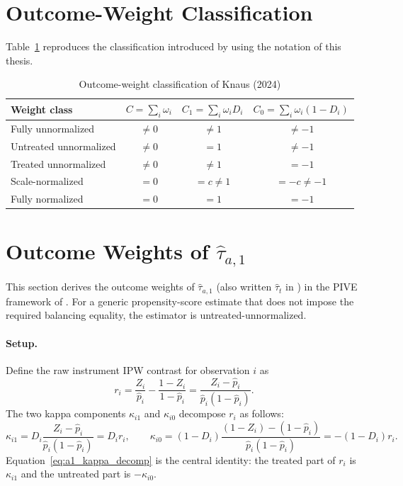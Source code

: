 \documentclass[12pt, a4paper, oneside]{article}
\theoremstyle{plain}
\theoremstyle{definition}
\begin{document}
\section{Outcome-Weight Classification}
Table~\ref{tab:knaus_weight_classes} reproduces the classification introduced
by \citet[Table~4]{knaus2024treatment} using the notation of this thesis.
\begin{table}[htbp]
\centering
\caption{Outcome-weight classification of Knaus (2024)}
\label{tab:knaus_weight_classes}
\begin{tabular}{lccc}
\toprule
Weight class
& \(C=\sum_i\omega_i\)
& \(C_1=\sum_i\omega_iD_i\)
& \(C_0=\sum_i\omega_i(1-D_i)\) \\
\midrule
Fully unnormalized
& \(\neq 0\)
& \(\neq 1\)
& \(\neq -1\) \\

Untreated unnormalized
& \(\neq 0\)
& \(=1\)
& \(\neq -1\) \\

Treated unnormalized
& \(\neq 0\)
& \(\neq 1\)
& \(=-1\) \\

Scale-normalized
& \(=0\)
& \(=c\neq1\)
& \(=-c\neq-1\) \\

Fully normalized
& \(=0\)
& \(=1\)
& \(=-1\) \\
\bottomrule
\end{tabular}
\end{table}




\section{Outcome Weights of \texorpdfstring{$\hat\tau_{a,1}$}{tau(a,1)}}
\label{app:omega_a1}

This section derives the outcome weights of $\hat\tau_{a,1}$ (also written $\hat\tau_t$
in \citealt{sloczynski2025abadie}) in the PIVE framework of
\citet{knaus2024treatment}. For a generic propensity-score estimate that does
not impose the required balancing equality, the estimator is
untreated-unnormalized.

\paragraph{Setup.}
Define the raw instrument IPW contrast for observation $i$ as
\begin{equation}
  r_i = \frac{Z_i}{\hat{p}_i} - \frac{1-Z_i}{1-\hat{p}_i}
      = \frac{Z_i - \hat{p}_i}{\hat{p}_i(1-\hat{p}_i)}.
  \label{eq:a1_ri}
\end{equation}
The two kappa components $\kappa_{i1}$ and $\kappa_{i0}$ decompose $r_i$ as follows:
\begin{equation}
  \kappa_{i1} = D_i \frac{Z_i - \hat{p}_i}{\hat{p}_i(1-\hat{p}_i)} = D_i r_i,
  \qquad
  \kappa_{i0} = (1-D_i)\frac{(1-Z_i)-(1-\hat{p}_i)}{\hat{p}_i(1-\hat{p}_i)}
              = -(1-D_i)r_i.
  \label{eq:a1_kappa_decomp}
\end{equation}
Equation~\eqref{eq:a1_kappa_decomp} is the central identity: the treated part of $r_i$
is $\kappa_{i1}$ and the untreated part is $-\kappa_{i0}$.
\end{document}

